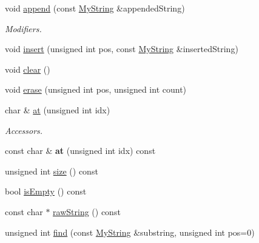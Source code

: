 \begin{DoxyCompactItemize}
\item 
void \hyperlink{classMyString_af63b9b7a112088b2133b28f735ca0c4f}{append} (const \hyperlink{classMyString}{My\-String} \&appended\-String)
\begin{DoxyCompactList}\small\item\em Modifiers. \end{DoxyCompactList}\item 
void \hyperlink{classMyString_a815abd5c91361ef112923fde909f402b}{insert} (unsigned int pos, const \hyperlink{classMyString}{My\-String} \&inserted\-String)
\item 
void \hyperlink{classMyString_a7fc37d3cf514635d73d1a291864a2c2c}{clear} ()
\item 
void \hyperlink{classMyString_a5181e4e6dd43e67aaab9d506197dfcd8}{erase} (unsigned int pos, unsigned int count)
\item 
char \& \hyperlink{classMyString_a74036e0ffae135ff8e045c1b1a2a1c99}{at} (unsigned int idx)
\begin{DoxyCompactList}\small\item\em Accessors. \end{DoxyCompactList}\item 
\hypertarget{classMyString_a562c50c8dcff875873052f0f4439759b}{const char \& {\bfseries at} (unsigned int idx) const }\label{classMyString_a562c50c8dcff875873052f0f4439759b}

\item 
unsigned int \hyperlink{classMyString_a9f71e8c0be415906d4b9713975bba0bc}{size} () const 
\item 
bool \hyperlink{classMyString_a7de2386f455be51c728a418cadb02289}{is\-Empty} () const 
\item 
const char $\ast$ \hyperlink{classMyString_accc7aa9004aa6626167bf10df21c9c1a}{raw\-String} () const 
\item 
\hypertarget{classMyString_a7748d474b6c4017cad1e1d3d2b28aeae}{unsigned int \hyperlink{classMyString_a7748d474b6c4017cad1e1d3d2b28aeae}{find} (const \hyperlink{classMyString}{My\-String} \&substring, unsigned int pos=0)}\label{classMyString_a7748d474b6c4017cad1e1d3d2b28aeae}


\end{DoxyCompactItemize}
